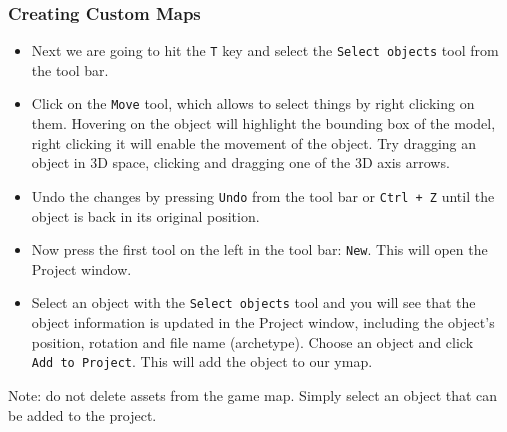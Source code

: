 \documentclass[
  openany]{book}
\begin{document}
\hypertarget{creating-custom-maps}{%
\subsubsection*{Creating Custom Maps}\label{creating-custom-maps}}

\begin{itemize}
\item
  Next we are going to hit the \texttt{T} key and select the \texttt{Select\ objects} tool from the tool bar.
\item
  Click on the \texttt{Move} tool, which allows to select things by right clicking on them. Hovering on the object will highlight the bounding box of the model, right clicking it will enable the movement of the object. Try dragging an object in 3D space, clicking and dragging one of the 3D axis arrows.
\item
  Undo the changes by pressing \texttt{Undo} from the tool bar or \texttt{Ctrl\ +\ Z} until the object is back in its original position.
\item
  Now press the first tool on the left in the tool bar: \texttt{New}. This will open the Project window.
\item
  Select an object with the \texttt{Select\ objects} tool and you will see that the object information is updated in the Project window, including the object's position, rotation and file name (archetype). Choose an object and click \texttt{Add\ to\ Project}. This will add the object to our ymap.
\end{itemize}

Note: do not delete assets from the game map. Simply select an object that can be added to the project.
\end{document}

